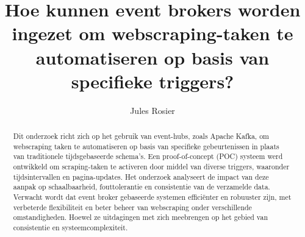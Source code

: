 \documentclass{hogent-article}
\title{Hoe kunnen event brokers worden ingezet om webscraping-taken te automatiseren op basis van specifieke triggers?}
\author{Jules Rosier}
\begin{document}
\begin{abstract}
  Dit onderzoek richt zich op het gebruik van event-hubs, zoals Apache Kafka, om webscraping taken te automatiseren op basis van specifieke gebeurtenissen in plaats van traditionele tijdsgebaseerde schema’s. Een proof-of-concept (POC) systeem werd ontwikkeld om scraping-taken te activeren door middel van diverse triggers, waaronder tijdsintervallen en pagina-updates. Het onderzoek analyseert de impact van deze aanpak op schaalbaarheid, fouttolerantie en consistentie van de verzamelde data. Verwacht wordt dat event broker gebaseerde systemen efficiënter en robuuster zijn, met verbeterde flexibiliteit en beter beheer van webscraping onder verschillende omstandigheden. Hoewel ze uitdagingen met zich meebrengen op het gebied van consistentie en systeemcomplexiteit.
\end{abstract}

\tableofcontents



\printbibliography[heading=bibintoc]
\end{document}
